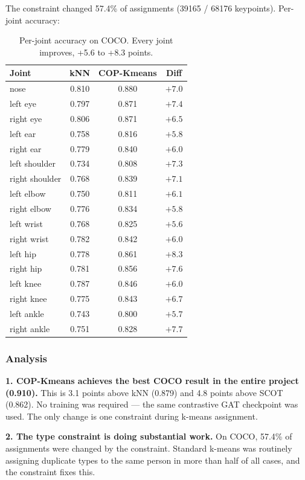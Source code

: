 The constraint changed 57.4\% of assignments (39165 / 68176 keypoints). Per-joint accuracy:

\begin{table}[H]
\centering
\footnotesize
\begin{tabular}{lccc}
\toprule
Joint & kNN & COP-Kmeans & Diff \\
\midrule
nose & 0.810 & 0.880 & $+7.0$ \\
left eye & 0.797 & 0.871 & $+7.4$ \\
right eye & 0.806 & 0.871 & $+6.5$ \\
left ear & 0.758 & 0.816 & $+5.8$ \\
right ear & 0.779 & 0.840 & $+6.0$ \\
left shoulder & 0.734 & 0.808 & $+7.3$ \\
right shoulder & 0.768 & 0.839 & $+7.1$ \\
left elbow & 0.750 & 0.811 & $+6.1$ \\
right elbow & 0.776 & 0.834 & $+5.8$ \\
left wrist & 0.768 & 0.825 & $+5.6$ \\
right wrist & 0.782 & 0.842 & $+6.0$ \\
left hip & 0.778 & 0.861 & $+8.3$ \\
right hip & 0.781 & 0.856 & $+7.6$ \\
left knee & 0.787 & 0.846 & $+6.0$ \\
right knee & 0.775 & 0.843 & $+6.7$ \\
left ankle & 0.743 & 0.800 & $+5.7$ \\
right ankle & 0.751 & 0.828 & $+7.7$ \\
\bottomrule
\end{tabular}
\caption{Per-joint accuracy on COCO. Every joint improves, +5.6 to +8.3 points.}
\end{table}


\subsubsection{Analysis}

\textbf{1. COP-Kmeans achieves the best COCO result in the entire project (0.910).} This is 3.1 points above kNN (0.879) and 4.8 points above SCOT (0.862). No training was required --- the same contrastive GAT checkpoint was used. The only change is one constraint during k-means assignment.

\textbf{2. The type constraint is doing substantial work.} On COCO, 57.4\% of assignments were changed by the constraint. Standard k-means was routinely assigning duplicate types to the same person in more than half of all cases, and the constraint fixes this.

